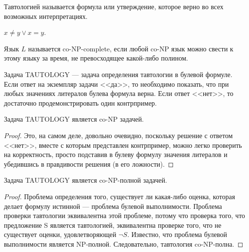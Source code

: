     \begin{Def}[Тавтология]
        Тавтологией называется формула или утверждение, которое верно во всех возможных интерпретациях.
    \end{Def}
    \begin{Example}
        $x \neq y \lor x = y$.
    \end{Example}
    \begin{Def}[co-NP-complete]
        Язык $L$ называется co-NP-complete, если любой co-NP язык можно свести к этому языку за время, не превосходящее какой-либо полином.
    \end{Def}
    \begin{Def}
        Задача TAUTOLOGY --- задача определения тавтологии в булевой формуле. Если ответ на экземпляр задачи <<да>>, то необходимо показать, что при любых значениях литералов булева формула верна. Если ответ <<нет>>, то достаточно продемонстрировать один контрпример.
    \end{Def}
    \begin{Thm}
        Задача TAUTOLOGY является co-NP задачей.
    \end{Thm}
    \begin{proof}
        Это, на самом деле, довольно очевидно, поскольку решение с ответом <<нет>>, вместе с которым представлен контрпример, можно легко проверить на корректность, просто подставив в булеву формулу значения литералов и убедившись в правдивости решения (в его ложности).
    \end{proof}
    \begin{Thm}
        Задача TAUTOLOGY является co-NP-полной задачей.
    \end{Thm}
    \begin{proof}
        Проблема определения того, существует ли какая-либо оценка, которая делает формулу истинной --- проблема булевой выполнимости. Проблема проверки тавтологии эквивалентна этой проблеме, потому что проверка того, что предложение S является тавтологией, эквивалентна проверке того, что не существует оценки, удовлетворяющей $\lnot S$. Известно, что проблема булевой выполнимости является NP-полной. Следовательно, тавтология co-NP-полна. 
    \end{proof}
    
    
    
